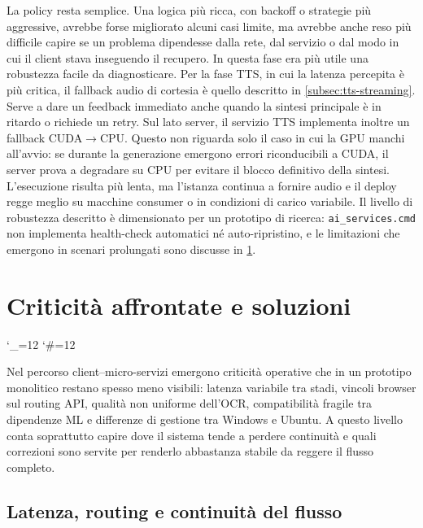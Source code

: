 La policy resta semplice. Una logica più ricca, con backoff o strategie più aggressive, avrebbe forse migliorato alcuni casi limite, ma avrebbe anche reso più difficile capire se un problema dipendesse dalla rete, dal servizio o dal modo in cui il client stava inseguendo il recupero. In questa fase era più utile una robustezza facile da diagnosticare. Per la fase TTS, in cui la latenza percepita è più critica, il fallback audio di cortesia è quello descritto in \autoref{subsec:tts-streaming}. Serve a dare un feedback immediato anche quando la sintesi principale è in ritardo o richiede un retry. Sul lato server, il servizio TTS implementa inoltre un fallback CUDA$\rightarrow$CPU. Questo non riguarda solo il caso in cui la GPU manchi all'avvio: se durante la generazione emergono errori riconducibili a CUDA, il server prova a degradare su CPU per evitare il blocco definitivo della sintesi. L'esecuzione risulta più lenta, ma l'istanza continua a fornire audio e il deploy regge meglio su macchine consumer o in condizioni di carico variabile. Il livello di robustezza descritto è dimensionato per un prototipo di ricerca: \texttt{ai\_services.cmd} non implementa health-check automatici né auto-ripristino, e le limitazioni che emergono in scenari prolungati sono discusse in \ref{sec:problemi-soluzioni}.

\endgroup

\section{Criticità affrontate e soluzioni}
\label{sec:problemi-soluzioni}
\begingroup
\setlength{\emergencystretch}{3em}
\hfuzz=200pt
\sloppy
\catcode`\_=12\relax
\catcode`\#=12\relax

Nel percorso client--micro-servizi emergono criticità operative che in un prototipo monolitico restano spesso meno visibili: latenza variabile tra stadi, vincoli browser sul routing API, qualità non uniforme dell'OCR, compatibilità fragile tra dipendenze ML e differenze di gestione tra Windows e Ubuntu. A questo livello conta soprattutto capire dove il sistema tende a perdere continuità e quali correzioni sono servite per renderlo abbastanza stabile da reggere il flusso completo.

\subsection{Latenza, routing e continuità del flusso}
\label{subsec:latenza-timeout}\label{subsec:cors-routing}

